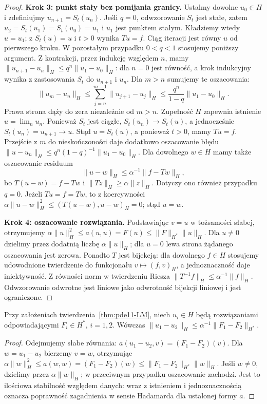 \begin{proof}
\textbf{Krok 3: punkt stały bez pomijania granicy.}
Ustalmy dowolne $u_0\in H$ i zdefiniujmy
$u_{n+1}=S_t(u_n)$.
Jeśli $q=0$, odwzorowanie $S_t$ jest stałe,
zatem $u_2=S_t(u_1)=S_t(u_0)=u_1$ i $u_1$ jest
punktem stałym. Kładziemy wtedy $u=u_1$;
z $S_t(u)=u$ i $t>0$ wynika $Tu=f$.
Ciąg iteracji jest równy $u$ od pierwszego kroku.
W pozostałym przypadku $0<q<1$ stosujemy poniższy argument.
Z kontrakcji, przez indukcję względem $n$, mamy
$\|u_{n+1}-u_n\|_H\le q^n\|u_1-u_0\|_H$:
dla $n=0$ jest równość, a krok indukcyjny wynika
z zastosowania $S_t$ do $u_{n+1}$ i $u_n$.
Dla $m>n$ sumujemy te oszacowania:
\[
 \|u_m-u_n\|_H\le
 \sum_{j=n}^{m-1}\|u_{j+1}-u_j\|_H
 \le\frac{q^n}{1-q}\|u_1-u_0\|_H.
\]
Prawa strona dąży do zera niezależnie od $m>n$.
Zupełność $H$ zapewnia istnienie $u=\lim_nu_n$.
Ponieważ $S_t$ jest ciągłe, $S_t(u_n)\to S_t(u)$,
a jednocześnie $S_t(u_n)=u_{n+1}\to u$.
Stąd $u=S_t(u)$, a ponieważ $t>0$, mamy $Tu=f$.
Przejście z $m$ do nieskończoności daje dodatkowo
oszacowanie błędu
$\|u-u_n\|_H\le q^n(1-q)^{-1}\|u_1-u_0\|_H$.
Dla dowolnego $w\in H$ mamy także oszacowanie
residuum
\[
 \|u-w\|_H\le\alpha^{-1}\|f-Tw\|_H,
\]
bo $T(u-w)=f-Tw$ i $\|Tz\|_H\ge\alpha\|z\|_H$.
Dotyczy ono również przypadku $q=0$.
Jeżeli $Tu=f=Tw$, to z koercywności
$\alpha\|u-w\|_H^2\le(T(u-w),u-w)_H=0$;
stąd $u=w$.

\textbf{Krok 4: oszacowanie rozwiązania.}
Podstawiając $v=u$ w tożsamości słabej, otrzymujemy
$\alpha\|u\|_H^2\le a(u,u)=F(u)
\le\|F\|_{H^*}\|u\|_H$.
Dla $u\ne0$ dzielimy przez dodatnią liczbę $\alpha\|u\|_H$;
dla $u=0$ lewa strona żądanego oszacowania jest zerowa.
Ponadto $T$ jest bijekcją: dla dowolnego $f\in H$
stosujemy udowodnione twierdzenie do funkcjonału
$v\mapsto(f,v)_H$, a jednoznaczność daje iniektywność.
Z równości norm w twierdzeniu Riesza
$\|T^{-1}f\|_H\le\alpha^{-1}\|f\|_H$.
Odwzorowanie odwrotne jest liniowe jako odwrotność
bijekcji liniowej i jest ograniczone.
\end{proof}

\begin{wniosek}
\label{cor:pde11-stability}
Przy założeniach twierdzenia~\ref{thm:pde11-LM},
niech $u_i\in H$ będą rozwiązaniami odpowiadającymi
$F_i\in H^*$, $i=1,2$. Wówczas
$\|u_1-u_2\|_H\le\alpha^{-1}\|F_1-F_2\|_{H^*}$.
\end{wniosek}
\begin{proof}
Odejmujemy słabe równania: $a(u_1-u_2,v)=(F_1-F_2)(v)$.
Dla $w=u_1-u_2$ bierzemy $v=w$, otrzymując
$\alpha\|w\|_H^2\le a(w,w)=(F_1-F_2)(w)
\le\|F_1-F_2\|_{H^*}\|w\|_H$.
Jeśli $w\ne0$, dzielimy przez $\alpha\|w\|_H$;
w przeciwnym przypadku oszacowanie zachodzi.
Jest to ilościowa stabilność względem danych:
wraz z istnieniem i jednoznacznością oznacza poprawność
zagadnienia w sensie Hadamarda dla ustalonej formy $a$.
\end{proof}


